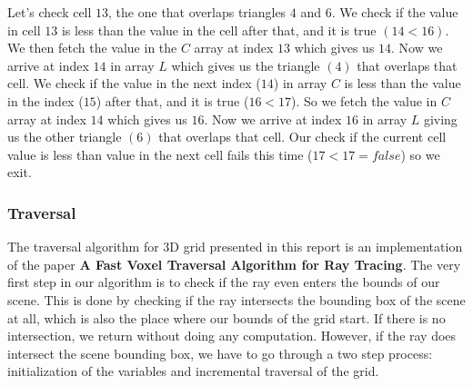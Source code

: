 \documentclass[11pt,a4paper]{article}
\begin{document}
\noindent
Let's check cell $13$, the one that overlaps triangles $4$ and $6$. We check if the value in cell $13$ is less than the value in the cell after that, and it is true $(14 < 16)$. We then fetch the value in the $C$ array at index $13$ which gives us $14$. Now we arrive at index $14$ in array $L$ which gives us the triangle $(4)$ that overlaps that cell. We check if the value in the next index ($14$) in array $C$ is less than the value in the index ($15$) after that, and it is true ($16 < 17$). So we fetch the value in $C$ array at index $14$ which gives us $16$. Now we arrive at index $16$ in array $L$ giving us the other triangle $(6)$ that overlaps that cell. Our check if the current cell value is less than value in the next cell fails this time ($17 < 17 = false$) so we exit.
\subsubsection{Traversal}

The  traversal algorithm for 3D grid presented in this report is an implementation of the paper \textbf{A Fast Voxel Traversal Algorithm for Ray Tracing}\cite{amanatides1987fast}. The very first step in our algorithm is to check if the ray even enters the bounds of our scene. This is done by checking if the ray intersects the bounding box of the scene at all, which is also the place where our bounds of the grid start. If there is no intersection, we return without doing any computation. However, if the ray does intersect the scene bounding box, we have to go through a two step process: initialization of the variables and incremental traversal of the grid. 
\end{document}
